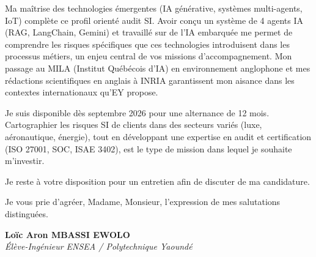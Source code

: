 \documentclass[a4paper,11pt]{article}
\begin{document}
Ma maîtrise des technologies émergentes (IA générative, systèmes multi-agents, IoT) complète ce profil orienté audit SI. Avoir conçu un système de 4 agents IA (RAG, LangChain, Gemini) et travaillé sur de l'IA embarquée me permet de comprendre les risques spécifiques que ces technologies introduisent dans les processus métiers, un enjeu central de vos missions d'accompagnement. Mon passage au MILA (Institut Québécois d'IA) en environnement anglophone et mes rédactions scientifiques en anglais à INRIA garantissent mon aisance dans les contextes internationaux qu'EY propose.

Je suis disponible dès septembre 2026 pour une alternance de 12 mois. Cartographier les risques SI de clients dans des secteurs variés (luxe, aéronautique, énergie), tout en développant une expertise en audit et certification (ISO 27001, SOC, ISAE 3402), est le type de mission dans lequel je souhaite m'investir.

Je reste à votre disposition pour un entretien afin de discuter de ma candidature.

Je vous prie d'agréer, Madame, Monsieur, l'expression de mes salutations distinguées.

\vspace{0.8cm}

\textbf{Loïc Aron MBASSI EWOLO}\\
\textit{Élève-Ingénieur ENSEA / Polytechnique Yaoundé}
\end{document}
